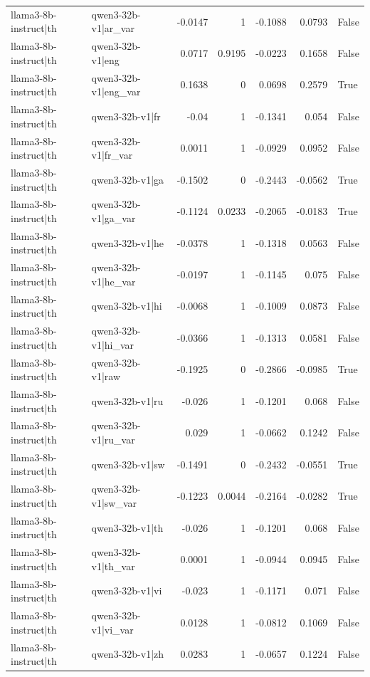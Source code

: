 \begin{table}
\begin{tabular}{l l r r r r l}
llama3-8b-instruct|th & qwen3-32b-v1|ar_var & -0.0147 & 1 & -0.1088 & 0.0793 & False \\
llama3-8b-instruct|th & qwen3-32b-v1|eng & 0.0717 & 0.9195 & -0.0223 & 0.1658 & False \\
llama3-8b-instruct|th & qwen3-32b-v1|eng_var & 0.1638 & 0 & 0.0698 & 0.2579 & True \\
llama3-8b-instruct|th & qwen3-32b-v1|fr & -0.04 & 1 & -0.1341 & 0.054 & False \\
llama3-8b-instruct|th & qwen3-32b-v1|fr_var & 0.0011 & 1 & -0.0929 & 0.0952 & False \\
llama3-8b-instruct|th & qwen3-32b-v1|ga & -0.1502 & 0 & -0.2443 & -0.0562 & True \\
llama3-8b-instruct|th & qwen3-32b-v1|ga_var & -0.1124 & 0.0233 & -0.2065 & -0.0183 & True \\
llama3-8b-instruct|th & qwen3-32b-v1|he & -0.0378 & 1 & -0.1318 & 0.0563 & False \\
llama3-8b-instruct|th & qwen3-32b-v1|he_var & -0.0197 & 1 & -0.1145 & 0.075 & False \\
llama3-8b-instruct|th & qwen3-32b-v1|hi & -0.0068 & 1 & -0.1009 & 0.0873 & False \\
llama3-8b-instruct|th & qwen3-32b-v1|hi_var & -0.0366 & 1 & -0.1313 & 0.0581 & False \\
llama3-8b-instruct|th & qwen3-32b-v1|raw & -0.1925 & 0 & -0.2866 & -0.0985 & True \\
llama3-8b-instruct|th & qwen3-32b-v1|ru & -0.026 & 1 & -0.1201 & 0.068 & False \\
llama3-8b-instruct|th & qwen3-32b-v1|ru_var & 0.029 & 1 & -0.0662 & 0.1242 & False \\
llama3-8b-instruct|th & qwen3-32b-v1|sw & -0.1491 & 0 & -0.2432 & -0.0551 & True \\
llama3-8b-instruct|th & qwen3-32b-v1|sw_var & -0.1223 & 0.0044 & -0.2164 & -0.0282 & True \\
llama3-8b-instruct|th & qwen3-32b-v1|th & -0.026 & 1 & -0.1201 & 0.068 & False \\
llama3-8b-instruct|th & qwen3-32b-v1|th_var & 0.0001 & 1 & -0.0944 & 0.0945 & False \\
llama3-8b-instruct|th & qwen3-32b-v1|vi & -0.023 & 1 & -0.1171 & 0.071 & False \\
llama3-8b-instruct|th & qwen3-32b-v1|vi_var & 0.0128 & 1 & -0.0812 & 0.1069 & False \\
llama3-8b-instruct|th & qwen3-32b-v1|zh & 0.0283 & 1 & -0.0657 & 0.1224 & False \\

\end{tabular}
\end{table}
